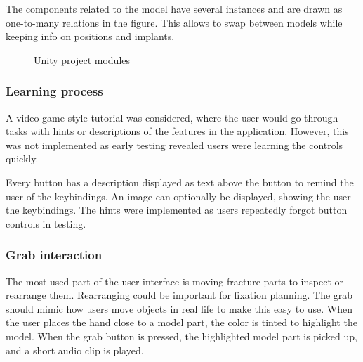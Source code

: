 \documentclass[a4paper]{report}
\begin{document}
The components related to the model have several instances and are drawn as one-to-many relations in the figure. This allows to swap between models while keeping info on positions and implants.

\begin{figure}[h!]
    \centering
	\hfill
  \caption{Unity project modules}\label{structure}
  \small

\end{figure}

\subsubsection{Learning process}
A video game style tutorial was considered, where the user would go through tasks with hints or descriptions of the features in the application. However, this was not implemented as early testing revealed users were learning the controls quickly.

Every button has a description displayed as text above the button to remind the user of the keybindings. An image can optionally be displayed, showing the user the keybindings. The hints were implemented as users repeatedly forgot button controls in testing.

\subsubsection{Grab interaction}

The most used part of the user interface is moving fracture parts to inspect or rearrange them. Rearranging could be important for fixation planning.
The grab should mimic how users move objects in real life to make this easy to use. When the user places the hand close to a model part, the color is tinted to highlight the model. When the grab button is pressed, the highlighted model part is picked up, and a short audio clip is played.
\end{document}
